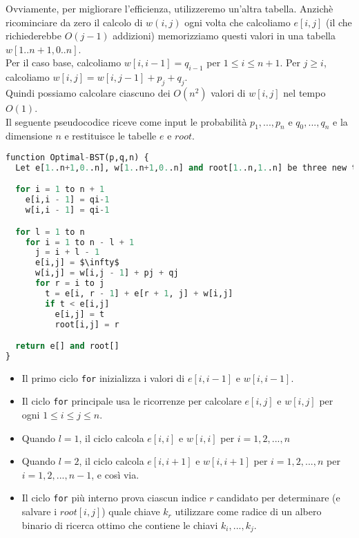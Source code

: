 Ovviamente, per migliorare l'efficienza, utilizzeremo un'altra tabella.
Anzichè ricominciare da zero il calcolo di $w(i,j)$ ogni volta che
calcoliamo $e[i,j]$ (il che richiederebbe $O(j-1)$ addizioni)
memorizziamo questi valori in una tabella $w[1..n+1,0..n]$.\\
Per il caso base, calcoliamo $w[i, i-1] = q_{i-1}$ per $1 \le i \le n+1$.
Per $j \ge i$, calcoliamo $w[i,j] = w[i, j-1] + p_j + q_j$.\\

Quindi possiamo calcolare ciascuno dei $O(n^2)$ valori di $w[i,j]$
nel tempo $O(1)$.\\

Il seguente pseudocodice riceve come input le probabilità
$p_1, ..., p_n$ e $q_0, ..., q_n$ e la dimensione $n$ e
restituisce le tabelle $e$ e $root$.

\begin{lstlisting}[language=Python, mathescape=true]
function Optimal-BST(p,q,n) {
  Let e[1..n+1,0..n], w[1..n+1,0..n] and root[1..n,1..n] be three new table

  for i = 1 to n + 1
    e[i,i - 1] = qi-1
    w[i,i - 1] = qi-1

  for l = 1 to n
    for i = 1 to n - l + 1
      j = i + l - 1
      e[i,j] = $\infty$
      w[i,j] = w[i,j - 1] + pj + qj
      for r = i to j
        t = e[i, r - 1] + e[r + 1, j] + w[i,j]
        if t < e[i,j]
          e[i,j] = t
          root[i,j] = r

  return e[] and root[]
}
\end{lstlisting}


\begin{itemize}
  \item
        Il primo ciclo \texttt{for} inizializza i valori di $e[i,i - 1]$ e
        $w[i,i - 1]$.
  \item
        Il ciclo \texttt{for} principale usa le ricorrenze per calcolare
        $e[i,j]$ e $w[i,j]$ per ogni $1 \le i \le j \le n$.
  \item
        Quando $l = 1$, il ciclo calcola $e[i,i]$ e $w[i,i]$ per
        $i = 1, 2, ..., n$
  \item
        Quando $l = 2$, il ciclo calcola $e[i,i+1]$ e $w[i,i+1]$ per
        $i = 1, 2, ..., n$ per $i = 1, 2, ..., n-1$, e così via.
  \item
        Il ciclo \texttt{for} più interno prova ciascun indice $r$ candidato per
        determinare (e salvare i $root[i,j]$) quale chiave $k_r$
        utilizzare come radice di un albero binario di ricerca ottimo che
        contiene le chiavi $k_i, ..., k_j$.
\end{itemize}


